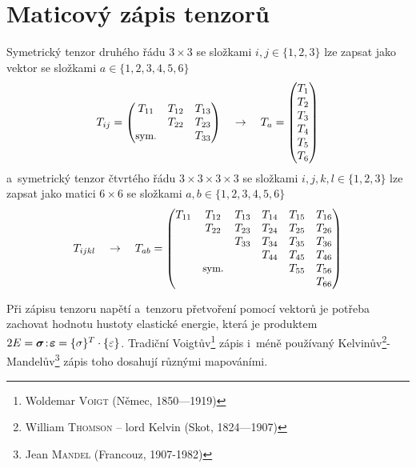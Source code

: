 
\section{Maticový zápis tenzorů}
Symetrický tenzor druhého řádu $3 \times 3$ se složkami $i,j \in \{1,2,3\}$ lze zapsat jako vektor se složkami $a \in \{1,2,3,4,5,6\}$
\begin{equation*}
	T_{ij} =
	\begin{pmatrix}
		T_{11} & T_{12} & T_{13} \\ & T_{22} & T_{23} \\ \text{\small sym.} & & T_{33} \\
	\end{pmatrix}
	\quad\rightarrow\quad
	T_a =
	\begin{pmatrix}
		T_1 \\ T_2 \\ T_3 \\ T_4 \\ T_5 \\ T_6 \\
	\end{pmatrix}
\end{equation*}
a~symetrický tenzor čtvrtého řádu $3 \times 3 \times 3 \times 3$ se složkami $i,j,k,l \in \{1,2,3\}$ lze zapsat jako matici $6 \times 6$ se složkami $a,b \in \{1,2,3,4,5,6\}$
\begin{equation*}
	T_{ijkl}
	\quad\rightarrow\quad
	T_{ab} =
	\begin{pmatrix}
		T_{11} & T_{12} & T_{13} & T_{14} & T_{15} & T_{16} \\
		& T_{22} & T_{23} & T_{24} & T_{25} & T_{26} \\
		& & T_{33} & T_{34} & T_{35} & T_{36} \\
		& & & T_{44} & T_{45} & T_{46} \\
		& \text{\small sym.} & & & T_{55} & T_{56} \\
		& & & & & T_{66} \\
	\end{pmatrix}
\end{equation*}

Při zápisu tenzoru napětí a~tenzoru přetvoření pomocí vektorů je potřeba zachovat hodnotu hustoty elastické energie, která je produktem $2E = \bm{\sigma}\!:\!\bm{\varepsilon} = \{\sigma\}^T\cdot\{\varepsilon\}$. Tradiční Voigtův\footnote{Woldemar \textsc{Voigt} (Němec, 1850---1919)} zápis i~méně používaný Kelvinův\footnote{William \textsc{Thomson} -- lord Kelvin (Skot, 1824---1907)}-Mandelův\footnote{Jean \textsc{Mandel} (Francouz, 1907-1982)} zápis toho dosahují různými mapováními.

